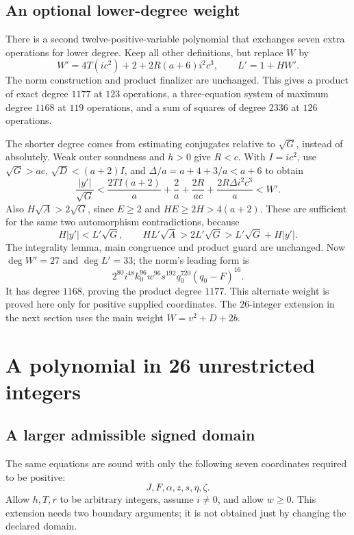 \documentclass[11pt]{article}
\theoremstyle{remark}\newtheorem{remark}[theorem]{Remark}
\begin{document}
\subsection{An optional lower-degree weight}

There is a second twelve-positive-variable polynomial that exchanges
seven extra operations for lower degree. Keep all other definitions,
but replace \(W\) by
\[
 W'=4T(ic^2)+2+2R(a+6)i^2c^3,\qquad L'=1+HW'.
\]
The norm construction and product finalizer are unchanged.
This gives a product of exact degree \(1177\) at \(123\) operations,
a three-equation system of maximum degree \(1168\) at \(119\)
operations, and a sum of squares of degree \(2336\) at \(126\)
operations.

The shorter degree comes from estimating conjugates relative to
\(\sqrt G\), instead of absolutely. Weak outer soundness and \(h>0\)
give \(R<c\). With \(I=ic^2\), use
\(\sqrt G>ac\), \(\sqrt D<(a+2)I\), and
\(\Delta/a=a+4+3/a<a+6\) to obtain
\[
 \frac{|y'|}{\sqrt G}
 <\frac{2TI(a+2)}a+\frac2a+\frac{2R}{ac}
                       +\frac{2R\Delta i^2c^3}{a}
 <W'.
\]
Also \(H\sqrt A>2\sqrt G\), since \(E\ge2\) and
\(HE\ge2H>4(a+2)\). These are sufficient for the same two
automorphism contradictions, because
\[
 H|y'|<L'\sqrt G,\qquad
 HL'\sqrt A>2L'\sqrt G>L'\sqrt G+H|y'|.
\]
The integrality lemma, main congruence and product guard are unchanged.
Now \(\deg W'=27\) and \(\deg L'=33\); the norm's leading form is
\[
 2^{80}i^{48}k_0^{96}w^{96}s^{192}q_0^{720}(q_0-F)^{16}.
\]
It has degree \(1168\), proving the product degree \(1177\).
This alternate weight is proved here only for positive supplied
coordinates. The \(26\)-integer extension in the next section uses
the main weight \(W=v^2+D+2b\).

\section{A polynomial in 26 unrestricted integers}\label{sec:integer}

\subsection{A larger admissible signed domain}

The same equations are sound with only the following seven coordinates
required to be positive:
\[
 J,F,\alpha,z,s,\eta,\zeta.
\]
Allow \(h,T,r\) to be arbitrary integers, assume \(i\ne0\), and
allow \(w\ge0\). This extension needs two boundary arguments; it is
not obtained just by changing the declared domain.
\end{document}
